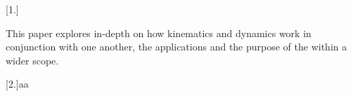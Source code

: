 \documentclass[12pt]{article}
\begin{document}

[1.] \parencite{kinematics} \par This paper explores in-depth on how kinematics and dynamics work in conjunction with one another,
the applications and the purpose of the  within a wider scope.

[2.]aa


\printbibliography
\end{document}

